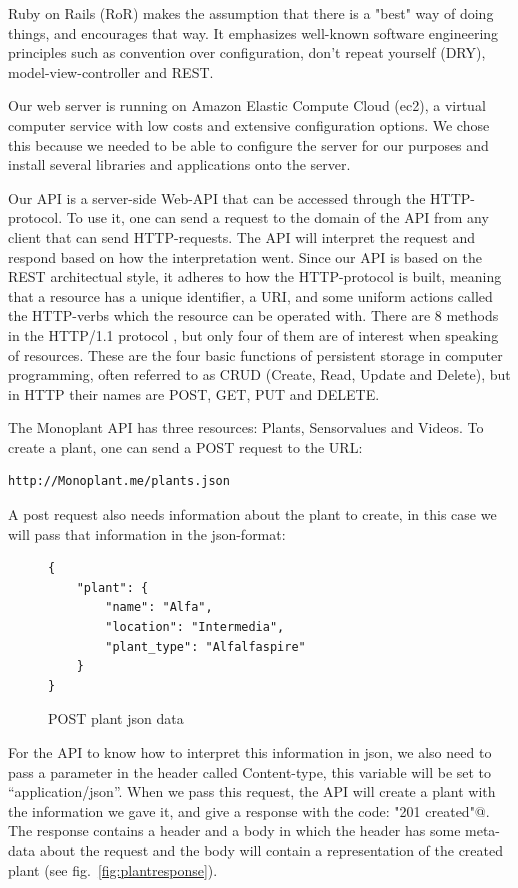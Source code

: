 Ruby on Rails (RoR) makes the assumption that there is a "best" way of doing things, and encourages that way. It emphasizes well-known software engineering principles such as convention over configuration, don't repeat yourself (DRY), model-view-controller and REST.

Our web server is running on Amazon Elastic Compute Cloud (ec2), a virtual computer service with low costs and extensive configuration options. We chose this because we needed to be able to configure the server for our purposes and install several libraries and applications onto the server. 

Our API is a server-side Web-API that can be accessed through the HTTP-protocol. To use it, one can send a request to the domain of the API from any client that can send HTTP-requests. The API will interpret the request and respond based on how the interpretation went. Since our API is based on the REST architectual style, it adheres to how the HTTP-protocol is built, meaning that a resource has a unique identifier, a URI, and some uniform actions called the HTTP-verbs which the resource can be operated with. There are 8 methods in the HTTP/1.1 protocol \citep[p.36]{fielding1999hypertext}, but only four of them are of interest when speaking of resources. These are the four basic functions of persistent storage in computer programming, often referred to as CRUD (Create, Read, Update and Delete), but in HTTP their names are POST, GET, PUT and DELETE. 

The Monoplant API has three resources: Plants, Sensorvalues and Videos. To create a plant, one can send a POST request to the URL: \begin{verbatim}http://Monoplant.me/plants.json\end{verbatim} A post request also needs information about the plant to create, in this case we will pass that information in the json-format:

\begin{figure}
	\begin{lstlisting}[style=htmlcssjs]
{
	"plant": {
		"name": "Alfa",
		"location": "Intermedia",
		"plant_type": "Alfalfaspire"
	}
}
	\end{lstlisting}
	\caption{POST plant json data}
	\label{fig:postdata}
\end{figure}

For the API to know how to interpret this information in json, we also need to pass a parameter in the header called Content-type, this variable will be set to “application/json”. When we pass this request, the API will create a plant with the information we gave it, and give a response with the code: \verb@"201 created"@. The response contains a header and a body in which the header has some meta-data about the request and the body will contain a representation of the created plant (see fig.~\ref{fig:plantresponse}).

